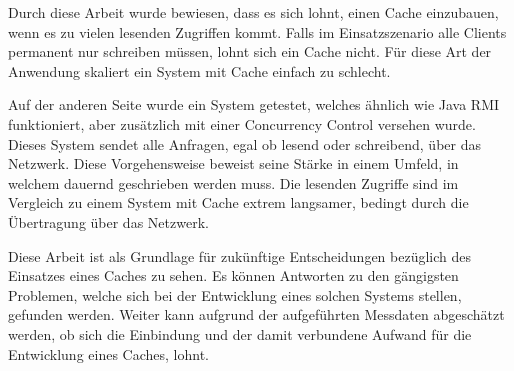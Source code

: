 Durch diese Arbeit wurde bewiesen, dass es sich lohnt, einen Cache einzubauen, wenn es zu vielen lesenden Zugriffen kommt. Falls im Einsatzszenario alle Clients permanent nur schreiben müssen, lohnt sich ein Cache nicht. Für diese Art der Anwendung skaliert ein System mit Cache einfach zu schlecht. 

Auf der anderen Seite wurde ein System getestet, welches ähnlich wie Java RMI funktioniert, aber zusätzlich mit einer Concurrency Control versehen wurde. Dieses System sendet alle Anfragen, egal ob lesend oder schreibend, über das Netzwerk. Diese Vorgehensweise beweist seine Stärke in einem Umfeld, in welchem dauernd geschrieben werden muss. Die lesenden Zugriffe sind im Vergleich zu einem System mit Cache extrem langsamer, bedingt durch die Übertragung über das Netzwerk.

Diese Arbeit ist als Grundlage für zukünftige Entscheidungen bezüglich des Einsatzes eines Caches zu sehen. Es können Antworten zu den gängigsten Problemen, welche sich bei der Entwicklung eines solchen Systems stellen, gefunden werden. Weiter kann aufgrund der aufgeführten Messdaten abgeschätzt werden, ob sich die Einbindung und der damit verbundene Aufwand für die Entwicklung eines Caches, lohnt.
